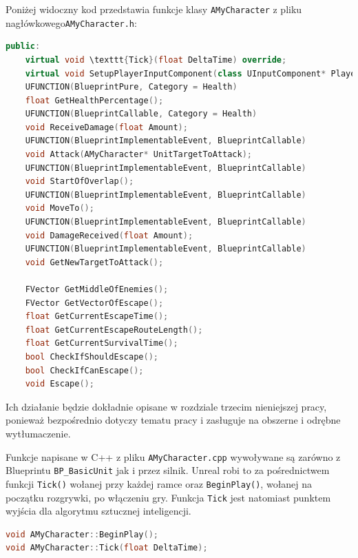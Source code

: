 \documentclass[12pt]{report}
\begin{document}
Poniżej widoczny kod przedstawia funkcje klasy \texttt{AMyCharacter} z pliku nagłówkowego\texttt{AMyCharacter.h}: 
\begin{lstlisting}[language=C++, backgroundcolor=\color{black!5}, basicstyle=\footnotesize, caption= Funkcje klasy AMyCharacter z pliku nagłówkowego \texttt{AMyCharacter.h}]
public:
	virtual void \texttt{Tick}(float DeltaTime) override;
	virtual void SetupPlayerInputComponent(class UInputComponent* PlayerInputComponent) override;
	UFUNCTION(BlueprintPure, Category = Health)
	float GetHealthPercentage();
	UFUNCTION(BlueprintCallable, Category = Health)
	void ReceiveDamage(float Amount);
	UFUNCTION(BlueprintImplementableEvent, BlueprintCallable)
	void Attack(AMyCharacter* UnitTargetToAttack);
	UFUNCTION(BlueprintImplementableEvent, BlueprintCallable)
	void StartOfOverlap();
	UFUNCTION(BlueprintImplementableEvent, BlueprintCallable)
	void MoveTo();
	UFUNCTION(BlueprintImplementableEvent, BlueprintCallable)
	void DamageReceived(float Amount);
	UFUNCTION(BlueprintImplementableEvent, BlueprintCallable)
	void GetNewTargetToAttack();

	FVector GetMiddleOfEnemies();
	FVector GetVectorOfEscape();
	float GetCurrentEscapeTime();
	float GetCurrentEscapeRouteLength();
	float GetCurrentSurvivalTime();
	bool CheckIfShouldEscape();
	bool CheckIfCanEscape();
	void Escape();
\end{lstlisting}
Ich działanie będzie dokładnie opisane w rozdziale trzecim nieniejszej pracy, ponieważ bezpośrednio dotyczy tematu pracy i zasługuje na obszerne i odrębne wytłumaczenie.

Funkcje napisane w C++ z pliku \texttt{AMyCharacter.cpp} wywoływane są zarówno z Blueprintu \texttt{BP\_BasicUnit} jak i przez silnik. Unreal robi to za pośrednictwem funkcji \texttt{\texttt{Tick}()} wołanej przy każdej ramce oraz \texttt{BeginPlay()}, wołanej na początku rozgrywki, po włączeniu gry. Funkcja \texttt{Tick} jest natomiast punktem wyjścia dla algorytmu sztucznej inteligencji. 
\begin{lstlisting}[language=C++, backgroundcolor=\color{black!5}, basicstyle=\footnotesize, caption= Funkcje wołane przez silnik w pliku \texttt{AMyCharacter.h}]
void AMyCharacter::BeginPlay();
void AMyCharacter::Tick(float DeltaTime);
\end{lstlisting}
\end{document}
